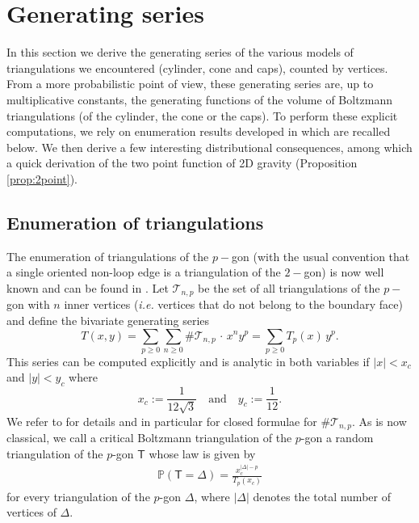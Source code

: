 \documentclass[10pt]{amsart}
\theoremstyle{definition}\newtheorem{defi}[theo]{Definition}\newtheorem{rema}[theo]{Remark}\newtheorem{exam}[theo]{Example}\newtheorem{exem}[theo]{Example}\newtheorem{nota}[theo]{Notation}
\begin{document}
\section{Generating series} \label{sec:gs}
In this section we derive the generating series of the various models of triangulations we encountered (cylinder, cone and caps), counted by vertices. From a more probabilistic point of view, these generating series are, up to multiplicative constants, the generating functions of the volume of Boltzmann triangulations (of the cylinder, the cone or the caps).  To perform these explicit computations, we rely on enumeration results developed in \cite{M} which are recalled below. We then derive a few interesting distributional consequences, among which a quick derivation of the two point function of 2D gravity (Proposition \ref{prop:2point}).



\subsection{Enumeration of triangulations} \label{sec:combi}
The enumeration of triangulations of the $p-$gon (with the usual convention that a single oriented non-loop edge is a triangulation of the $2-$gon) is now well known and can be found  in \cite{GouldenJackson}. Let $\mathcal{T}_{n,p}$ be the set of all triangulations of the $p-$gon with $n$ inner vertices (\emph{i.e.} vertices that do not belong to the boundary face) and define the bivariate generating series
\begin{equation}
\label{eq:Tseries}
T(x,y) = \sum_{p \geq 0} \sum_{n \geq 0} \# \mathcal{T}_{n,p} \, \cdot \, x^n y^{p} = \sum_{p \geq 0} T_p(x) \, y^{p}.
\end{equation}
This series can be computed explicitly and is analytic in both variables if $|x| < x_c$ and $|y| < y_c$ where
\begin{equation}
\label{eq:radii}
x_c := \frac{1}{12 \sqrt{3}}
\quad \text{and} \quad
y_c := \frac{1}{12}.
\end{equation}
We refer to \cite{Kr} for details and in particular for closed formulae for  $\# \mathcal{T}_{n,p}$. As is now classical, we call a critical Boltzmann triangulation of the $p$-gon a random triangulation of the $p$-gon $\mathsf T$ whose law is given by
\begin{align} \label{eq:Boltz}
\mathbb P \left( \mathsf T = \Delta \right) = \frac{x_c^{|\Delta|-p}}{T_p(x_c)}
\end{align}
for every triangulation of the $p$-gon $\Delta$, where $|\Delta|$ denotes the total number of vertices of $\Delta$.
\end{document}
